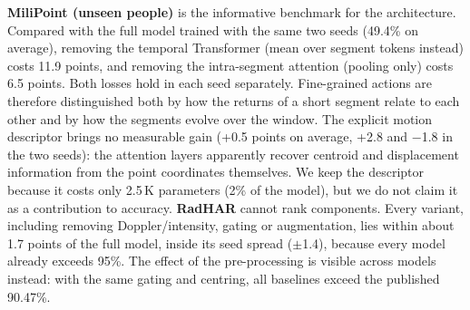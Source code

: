 \textbf{MiliPoint (unseen people)} is the informative benchmark for the
architecture. Compared with the full model trained with the same two seeds
(49.4\% on average), removing the temporal Transformer (mean over segment
tokens instead) costs 11.9 points, and removing the intra-segment attention
(pooling only) costs 6.5 points. Both losses hold in each seed separately.
Fine-grained actions are therefore distinguished both by how the returns of a
short segment relate to each other and by how the segments evolve over the
window. The explicit motion descriptor brings no measurable gain (+0.5 points on
average, +2.8 and $-$1.8 in the two seeds): the attention layers apparently
recover centroid and displacement information from the point coordinates
themselves. We keep the descriptor because it costs only 2.5\,K parameters (2\% of the model), but
we do not claim it as a contribution to accuracy. \textbf{RadHAR} cannot rank
components. Every variant, including removing Doppler/intensity, gating or
augmentation, lies within about 1.7 points of the full model, inside its
seed spread ($\pm$1.4), because every model already exceeds 95\%. The
effect of the pre-processing is visible across models instead: with the same gating
and centring, all baselines exceed the published 90.47\%.
